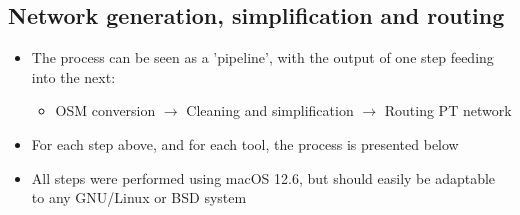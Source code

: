 \documentclass[11pt]{article}
\begin{document}
\subsection{Network generation, simplification and routing}
\label{sec:org6cf6946}
\begin{itemize}
\item The process can be seen as a 'pipeline', with the output of one step feeding into the next:
\begin{itemize}
\item OSM conversion \(\rightarrow\) Cleaning and simplification \(\rightarrow\) Routing PT network
\end{itemize}
\item For each step above, and for each tool, the process is presented below
\item All steps were performed using macOS 12.6, but should easily be adaptable to any GNU/Linux or BSD system
\end{itemize}
\end{document}

